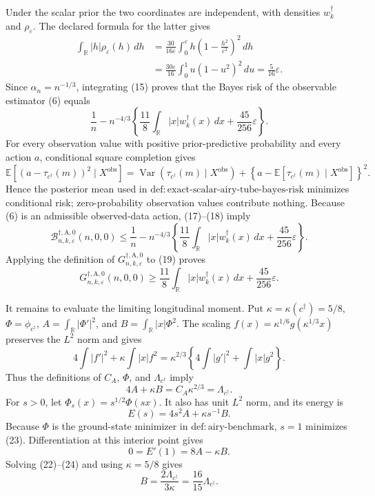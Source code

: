 Under the scalar prior the two coordinates are independent, with densities \(w_k^\dagger\) and \(\rho_\varepsilon\).  The declared formula for the latter gives
\[
\begin{aligned}
\int_{\mathbb R}|h|\rho_\varepsilon(h)\,dh
&=\frac{30}{16\varepsilon}\int_0^\varepsilon
h\left(1-\frac{h^2}{\varepsilon^2}\right)^2\,dh\\
&=\frac{30\varepsilon}{16}\int_0^1u(1-u^2)^2\,du
=\frac5{16}\varepsilon.
\end{aligned}
\tag{16}
\]
Since \(\alpha_n=n^{-1/3}\), integrating (15) proves that the Bayes risk of the observable estimator (6) equals
\[
\frac1n-n^{-4/3}\left\{
\frac{11}{8}\int_{\mathbb R}|x|w_k^\dagger(x)\,dx
+\frac{45}{256}\varepsilon\right\}.
\tag{17}
\]
For every observation value with positive prior-predictive probability and every action \(a\), conditional square completion gives
\[
\mathbb E[(a-\tau_{c^\dagger}(m))^2\mid X^{\mathrm{obs}}]
=\operatorname{Var}(\tau_{c^\dagger}(m)\mid X^{\mathrm{obs}})
+\left\{a-\mathbb E[\tau_{c^\dagger}(m)\mid X^{\mathrm{obs}}]\right\}^2.
\tag{18}
\]
Hence the posterior mean used in
\(\mathrm{def:exact\text{-}scalar\text{-}airy\text{-}tube\text{-}bayes\text{-}risk}\) minimizes conditional risk; zero-probability observation values contribute nothing.  Because (6) is an admissible observed-data action, (17)--(18) imply
\[
\mathcal B_{n,k,\varepsilon}^{\dagger,\mathrm A,0}(n,0,0)
\leq \frac1n-n^{-4/3}\left\{
\frac{11}{8}\int_{\mathbb R}|x|w_k^\dagger(x)\,dx
+\frac{45}{256}\varepsilon\right\}.
\tag{19}
\]
Applying the definition of
\(G_{n,k,\varepsilon}^{\dagger,\mathrm A,0}\) to (19) proves
\[
G_{n,k,\varepsilon}^{\dagger,\mathrm A,0}(n,0,0)
\geq
\frac{11}{8}\int_{\mathbb R}|x|w_k^\dagger(x)\,dx
+\frac{45}{256}\varepsilon.
\tag{20}
\]

It remains to evaluate the limiting longitudinal moment.  Put
\(\kappa=\kappa(c^\dagger)=5/8\),
\(\Phi=\phi_{c^\dagger}\),
\(A=\int_{\mathbb R}|\Phi'|^2\), and
\(B=\int_{\mathbb R}|x|\Phi^2\).  The scaling
\(f(x)=\kappa^{1/6}g(\kappa^{1/3}x)\) preserves the \(L^2\) norm and gives
\[
4\int|f'|^2+\kappa\int|x|f^2
=\kappa^{2/3}\left\{4\int|g'|^2+\int|x|g^2\right\}.
\tag{21}
\]
Thus the definitions of \(C_A\), \(\Phi\), and \(\Lambda_{c^\dagger}\) imply
\[
4A+\kappa B=C_A\kappa^{2/3}=\Lambda_{c^\dagger}.
\tag{22}
\]
For \(s>0\), let \(\Phi_s(x)=s^{1/2}\Phi(sx)\).  It also has unit \(L^2\) norm, and its energy is
\[
E(s)=4s^2A+\kappa s^{-1}B.
\tag{23}
\]
Because \(\Phi\) is the ground-state minimizer in
\(\mathrm{def:airy\text{-}benchmark}\), \(s=1\) minimizes (23).  Differentiation at this interior point gives
\[
0=E'(1)=8A-\kappa B.
\tag{24}
\]
Solving (22)--(24) and using \(\kappa=5/8\) gives
\[
B=\frac{2\Lambda_{c^\dagger}}{3\kappa}
=\frac{16}{15}\Lambda_{c^\dagger}.
\tag{25}
\]

